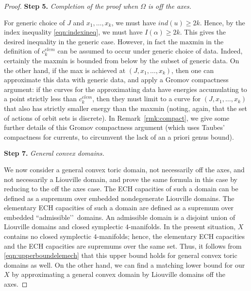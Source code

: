 \documentclass[11pt, reqno]{amsart}
\theoremstyle{remark}
\numberwithin{equation}{subsection}
\numberwithin{figure}{section}
\theoremstyle{customremark}
\newcommand{\NI}{{\noindent}}
\newcommand{\Om}{{\Omega}}
\newcommand{\MS}{{\medskip}}
\begin{document}
\begin{proof}
\NI {\bf Step 5.} {\it Completion of the proof when $\Om$ is off the axes.}  

For generic choice of $J$ and $x_1, \ldots, x_k$, we must have $ind(u) \ge 2k$.  Hence, by the index inequality \eqref{eqn:indexineq}, we must have $I(\alpha) \ge 2k$.  This gives the desired inequality in the generic case.  However, in fact the $\text{max} \text{min}$ in the definition of $c_k^{elem}$ can be assumed to occur under generic choice of data.  Indeed, certainly the maxmin is bounded from below by the subset of generic data.  On the other hand, if the max is achieved at $(J, x_1, \ldots, x_k)$, then one can approximate this data with generic data, and apply a Gromov compactness argument: if the curves for the approximating data have energies accumulating to a point strictly less than $c^{elem}_k$, then they must limit to a curve for $(J, x_1, \ldots, x_k)$ that also has strictly smaller energy than the maxmin (noting, again, that the set of actions of orbit sets is discrete).  In Remark~\ref{rmk:compact}, we give some further 
details of this Gromov compactness argument (which uses Taubes' compactness for currents, to circumvent the lack of an a priori genus bound).
\MS


\NI {\bf Step 7.} {\it General convex domains.}

We now consider a general convex toric domain, not necessarily off the axes, and not necessarily a Liouville domain, and prove the same formula in this case by reducing to the off the axes case.  The ECH capacities of such a domain can be defined as a supremum over embedded nondegenerate Liouville domains.  The elementary ECH capacities of such a domain are defined as a supremum over embedded ``admissible\rq\rq\, domains.   An admissible domain is a disjoint union of Liouville domains and closed symplectic $4$-manifolds.  In the present situation, $X$ contains no closed symplectic $4$-manifolds; hence, the elementary ECH capacities and the ECH capacities are supremums over the same set.  Thus, it follows from \eqref{eqn:upperboundelemech} that this upper bound holds for general convex toric domains as well.  On the other hand, we can find a matching lower bound for our $X$ by approximating a general convex domain by Liouville domains off the axes.
\end{proof}
\end{document}
